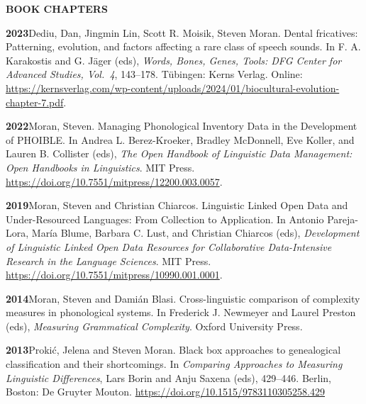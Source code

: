 \documentclass[11pt]{article}
\newcommand{\hangpara}{
 \setlength{\parindent}{0in} %
 \hangindent=0.42in %
}
\begin{document}
\vskip 20pt
\begin{flushleft}
{\bf BOOK CHAPTERS}
\end{flushleft}

\hangpara
{\bf 2023}\hspace{1ex}Dediu, Dan, Jingmin Lin, Scott R. Moisik, Steven Moran. Dental fricatives: Patterning, evolution, and factors affecting a rare class of speech sounds. In F. A. Karakostis and G. Jäger (eds), \textit{Words, Bones, Genes, Tools: DFG Center for Advanced Studies, Vol.\ 4}, 143--178. Tübingen: Kerns Verlag. Online: \url{https://kernsverlag.com/wp-content/uploads/2024/01/biocultural-evolution-chapter-7.pdf}.

\vskip 6pt
\hangpara
{\bf 2022}\hspace{1ex}Moran, Steven. Managing Phonological Inventory Data in the Development of PHOIBLE. In Andrea L. Berez-Kroeker, Bradley McDonnell, Eve Koller, and Lauren B. Collister (eds), \textit{The Open Handbook of Linguistic Data Management: Open Handbooks in Linguistics}. MIT Press. \url{https://doi.org/10.7551/mitpress/12200.003.0057}.

\vskip 6pt
\hangpara
{\bf 2019}\hspace{1ex}Moran, Steven and Christian Chiarcos. Linguistic Linked Open Data and Under-Resourced Languages: From Collection to Application. In Antonio Pareja-Lora, María Blume, Barbara C. Lust, and Christian Chiarcos (eds), \textit{Development of Linguistic Linked Open Data Resources for Collaborative Data-Intensive Research in the Language Sciences}. MIT Press. \url{https://doi.org/10.7551/mitpress/10990.001.0001}.


\vskip 6pt
\hangpara
{\bf 2014}\hspace{1ex}Moran, Steven and Dami{\'a}n Blasi. Cross-linguistic comparison of complexity measures in phonological systems. In Frederick J. Newmeyer and Laurel Preston (eds), {\it Measuring Grammatical Complexity}. Oxford University Press. 

\vskip 6pt
\hangpara
{\bf 2013}\hspace{1ex}Proki{\'c}, Jelena and Steven Moran. Black box approaches to genealogical classification and their shortcomings. In {\it Comparing Approaches to Measuring Linguistic Differences}, Lars Borin and Anju Saxena (eds), 429--446. Berlin, Boston: De Gruyter Mouton. \url{https://doi.org/10.1515/9783110305258.429}
\end{document}
